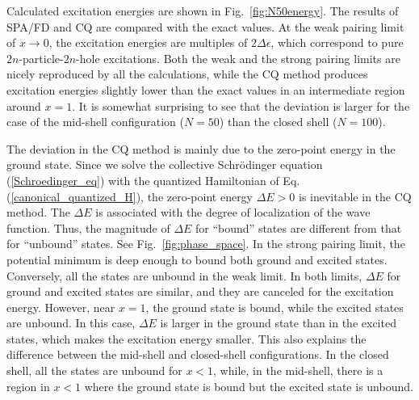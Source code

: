 \documentclass[%
superscriptaddress,
preprint,
showpacs,
nofootinbib,
amsmath,amssymb,
aps,
prc,
floatfix ]%
{revtex4-1}
\begin{document}
Calculated excitation energies are shown in Fig.~\ref{fig:N50energy}.
The results of SPA/FD and CQ are compared with the exact values.
At the weak pairing limit of $x\rightarrow 0$,
the excitation energies are multiples of $2\Delta\epsilon$, 
which correspond to pure $2n$-particle-$2n$-hole excitations.
Both the weak and the strong pairing limits
are nicely reproduced by all the calculations,
while the CQ method produces excitation energies slightly lower than the
exact values in an intermediate region around $x=1$.
It is somewhat surprising to see that the deviation is larger for
the case of the mid-shell configuration ($N=50$) than the closed shell
($N=100$).


The deviation in the CQ method is mainly due to the zero-point energy
in the ground state.
Since we solve the collective Schr\"odinger equation (\ref{Schroedinger_eq})
with the quantized Hamiltonian of Eq. (\ref{canonical_quantized_H}),
the zero-point energy $\Delta E>0$ is inevitable in the CQ method.
The $\Delta E$ is associated with the degree of localization of
the wave function.
Thus, the magnitude of $\Delta E$ for ``bound'' states are different
from that for ``unbound'' states.
See Fig.~\ref{fig:phase_space}.
In the strong pairing limit, the potential minimum is deep enough to bound
both ground and excited states.
Conversely, all the states are unbound in the weak limit.
In both limits, $\Delta E$ for ground and excited states are similar,
and they are canceled for the excitation energy.
However, near $x=1$, the ground state is bound,
while the excited states are unbound.
In this case, $\Delta E$ is larger in the ground state than in the
excited states, which makes the excitation energy smaller.
This also explains the difference between the mid-shell and closed-shell
configurations.
In the closed shell, all the states are unbound for $x<1$,
while, in the mid-shell,
there is a region in $x<1$ where the ground state is bound but
the excited state is unbound.
\end{document}
